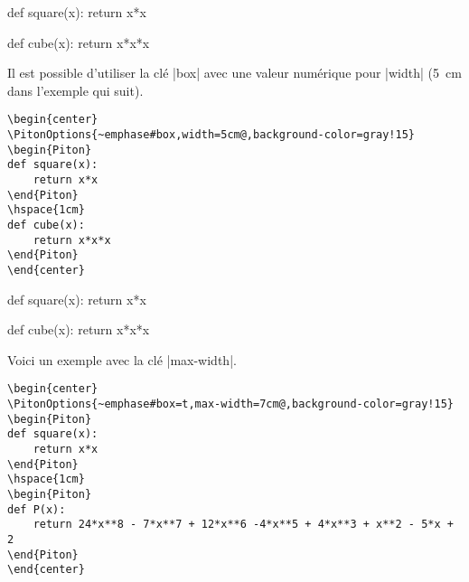 \documentclass[dvipsnames,svgnames]{article}
\begin{document}
\begin{center}
\begin{Piton}
def square(x):
    return x*x
\end{Piton}
\hspace{1cm}
\begin{Piton}
def cube(x):
    return x*x*x
\end{Piton}
\end{center}

\vspace{1cm} Il est possible d'utiliser la clé |box| avec une valeur numérique pour |width|
(5~cm dans l'exemple qui suit).

\begin{Verbatim}
\begin{center}
\PitonOptions{~emphase#box,width=5cm@,background-color=gray!15}
\begin{Piton}
def square(x):
    return x*x
\end{Piton}
\hspace{1cm}
def cube(x):
    return x*x*x
\end{Piton}
\end{center}
\end{Verbatim}

\begin{center}
\begin{Piton}
def square(x):
    return x*x
\end{Piton}
\hspace{1cm}
\begin{Piton}
def cube(x):
    return x*x*x
\end{Piton}
\end{center}


\vspace{1cm}
Voici un exemple avec la clé |max-width|.

\begin{Verbatim}
\begin{center}
\PitonOptions{~emphase#box=t,max-width=7cm@,background-color=gray!15}
\begin{Piton}
def square(x):
    return x*x
\end{Piton}
\hspace{1cm}
\begin{Piton}
def P(x):
    return 24*x**8 - 7*x**7 + 12*x**6 -4*x**5 + 4*x**3 + x**2 - 5*x + 2
\end{Piton}
\end{center}
\end{Verbatim}
\end{document}
